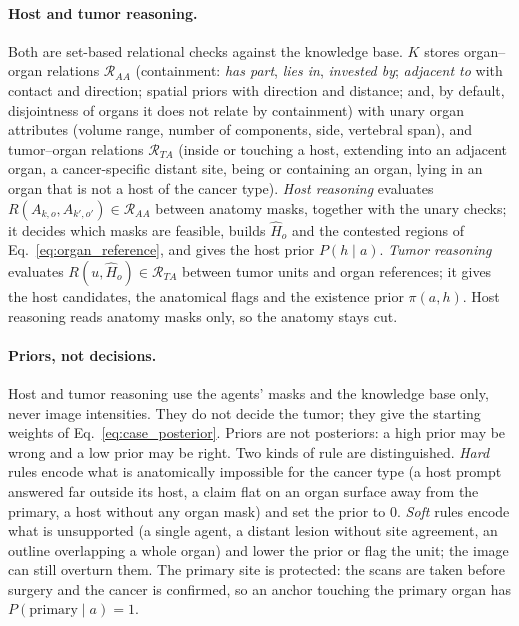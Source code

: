\documentclass[fleqn,10pt]{olplainarticle}
\begin{document}
\paragraph{Host and tumor reasoning.}
Both are set-based relational checks against the knowledge base. $K$ stores organ--organ relations $\mathcal{R}_{AA}$
(containment: \emph{has part}, \emph{lies in}, \emph{invested by}; \emph{adjacent to} with contact and direction; spatial
priors with direction and distance; and, by default, disjointness of organs it does not relate by containment) with unary
organ attributes (volume range, number of components, side, vertebral span), and tumor--organ relations $\mathcal{R}_{TA}$
(inside or touching a host, extending into an adjacent organ, a cancer-specific distant site, being or containing an organ,
lying in an organ that is not a host of the cancer type). \emph{Host reasoning} evaluates
$R(A_{k,o},A_{k',o'})\in\mathcal{R}_{AA}$ between anatomy masks, together with the unary checks; it decides which masks are
feasible, builds $\hat H_o$ and the contested regions of Eq.~\eqref{eq:organ_reference}, and gives the host prior
$P(h\mid a)$. \emph{Tumor reasoning} evaluates $R(u,\hat H_o)\in\mathcal{R}_{TA}$ between tumor units and organ references;
it gives the host candidates, the anatomical flags and the existence prior $\pi(a,h)$. Host reasoning reads anatomy masks
only, so the anatomy stays cut.

\paragraph{Priors, not decisions.}
Host and tumor reasoning use the agents' masks and the knowledge base only, never image intensities.
They do not decide the tumor; they give the starting weights of Eq.~\eqref{eq:case_posterior}. Priors are not
posteriors: a high prior may be wrong and a low prior may be right. Two kinds of rule are distinguished. \emph{Hard} rules
encode what is anatomically impossible for the cancer type (a host prompt answered far outside its host, a claim flat on
an organ surface away from the primary, a host without any organ mask) and set the prior to $0$. \emph{Soft} rules encode
what is unsupported (a single agent, a distant lesion without site agreement, an outline overlapping a whole organ) and
lower the prior or flag the unit; the image can still overturn them. The primary site is protected: the scans are taken
before surgery and the cancer is confirmed, so an anchor touching the primary organ has $P(\text{primary}\mid a)=1$.
\end{document}
